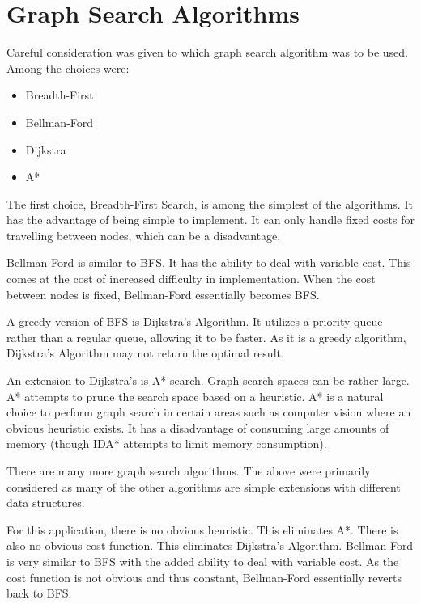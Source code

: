 \documentclass[12pt,letterpaper,oneside,notitlepage]{report}
\theoremstyle{definition}
\begin{document}
    \section{Graph Search Algorithms}
    \label{sec:graph-search-algos}
      Careful consideration was given to which graph search algorithm was to be used.  Among the choices were:
      
      \begin{itemize}
        \item Breadth-First
        \item Bellman-Ford
        \item Dijkstra
        \item A*
      \end{itemize}
      
      The first choice, Breadth-First Search, is among the simplest of the algorithms.  It has the advantage of being simple to implement.  It can only handle fixed costs for travelling between nodes, which can be a disadvantage.
      
      Bellman-Ford is similar to BFS.  It has the ability to deal with variable cost.  This comes at the cost of increased difficulty in implementation.  When the cost between nodes is fixed, Bellman-Ford essentially becomes BFS.
      
      A greedy version of BFS is Dijkstra's Algorithm.  It utilizes a priority queue rather than a regular queue, allowing it to be faster.  As it is a greedy algorithm, Dijkstra's Algorithm may not return the optimal result.
      
      An extension to Dijkstra's is A* search.  Graph search spaces can be rather large.  A* attempts to prune the search space based on a heuristic.  A* is a natural choice to perform graph search in certain areas such as computer vision where an obvious heuristic exists.  It has a disadvantage of consuming large amounts of memory (though IDA* attempts to limit memory consumption).
      
      There are many more graph search algorithms.  The above were primarily considered as many of the other algorithms are simple extensions with different data structures.
      
      For this application, there is no obvious heuristic.  This eliminates A*.  There is also no obvious cost function.  This eliminates Dijkstra's Algorithm.  Bellman-Ford is very similar to BFS with the added ability to deal with variable cost.  As the cost function is not obvious and thus constant, Bellman-Ford essentially reverts back to BFS.
      
\end{document}

